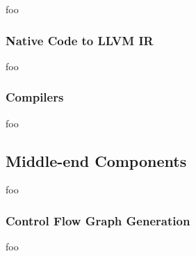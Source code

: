 foo


\subsubsection{Native Code to LLVM IR}

foo


\subsubsection{Compilers}

foo




\subsection{Middle-end Components}




foo


\subsubsection{Control Flow Graph Generation}

foo


